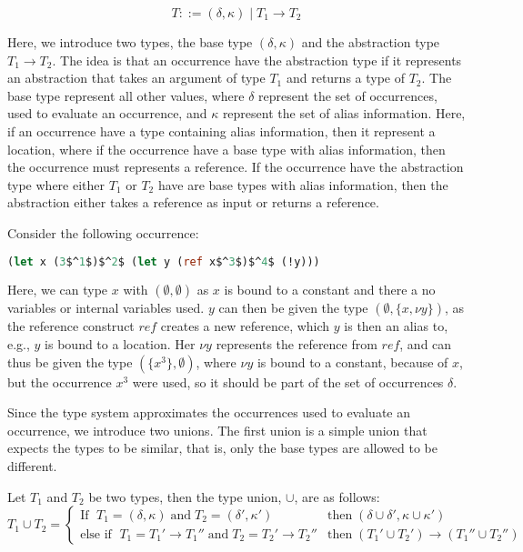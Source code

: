 \documentclass[../../master.tex]{subfiles}
\begin{document}
$$T::=(\delta,\kappa)\mid T_1 \rightarrow T_2$$

Here, we introduce two types, the base type $(\delta,\kappa)$ and the abstraction type $T_1 \rightarrow T_2$.
The idea is that an occurrence have the abstraction type if it represents an abstraction that takes an argument of type $T_1$ and returns a type of $T_2$.
The base type represent all other values, where $\delta$ represent the set of occurrences, used to evaluate an occurrence, and $\kappa$ represent the set of alias information.
Here, if an occurrence have a type containing alias information, then it represent a location, where if the occurrence have a base type with alias information, then the occurrence must represents a reference. 
If the occurrence have the abstraction type where either $T_1$ or $T_2$ have are base types with alias information, then the abstraction either takes a reference as input or returns a reference.

\begin{example}[]
Consider the following occurrence:
\begin{lstlisting}[language=Caml, mathescape=true]
(let x (3$^1$)$^2$ (let y (ref x$^3$)$^4$ (!y)))
\end{lstlisting}
Here, we can type $x$ with $(\emptyset,\emptyset)$ as $x$ is bound to a constant and there a no variables or internal variables used.
$y$ can then be given the type $(\emptyset,\{x,\nu y\})$, as the reference construct $ref$ creates a new reference, which $y$ is then an alias to, e.g., $y$ is bound to a location.
Her $\nu y$ represents the reference from $ref$, and can thus be given the type $(\{x^3\},\emptyset)$, where $\nu y$ is bound to a constant, because of $x$, but the occurrence $x^3$ were used, so it should be part of the set of occurrences $\delta$.
\end{example}

Since the type system approximates the occurrences used to evaluate an occurrence, we introduce two unions.
The first union is a simple union that expects the types to be similar, that is, only the base types are allowed to be different.
\begin{definition}
	Let $T_1$ and $T_2$ be two types, then the type union, $\cup$, are as follows:
	\begin{equation*}
		T_1\cup T_2=
		\left\{\begin{matrix}
			\mbox{If } \; T_1=(\delta,\kappa) \;\mbox{and}\; T_2=(\delta',\kappa')  & \mbox{then} \; (\delta\cup\delta',\kappa\cup\kappa')\\
			\mbox{else if } \; T_1=T_1'\rightarrow T_1''\;\mbox{and}\;T_2=T_2'\rightarrow T_2'' & \mbox{then} \; (T_1'\cup T_2')\rightarrow (T_1''\cup T_2'')
		\end{matrix}\right.
	\end{equation*}
\end{definition}
\end{document}
